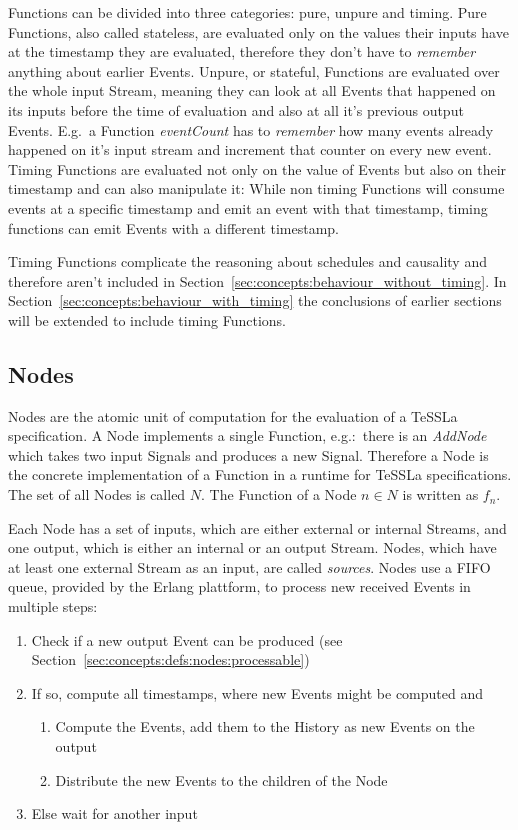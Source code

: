 Functions can be divided into three categories: pure, unpure and timing.
Pure Functions, also called stateless, are evaluated only on the values their inputs have at the timestamp they are evaluated, therefore they don't have to \emph{remember} anything about earlier Events.
Unpure, or stateful, Functions are evaluated over the whole input Stream, meaning they can look at all Events that happened on its inputs before the time of evaluation and also at all it's previous output Events.
E.g.\ a Function \emph{eventCount} has to \emph{remember} how many events already happened on it's input stream and increment that counter on every new event.
Timing Functions are evaluated not only on the value of Events but also on their timestamp and can also manipulate it:
While non timing Functions will consume events at a specific timestamp and emit an event with that timestamp, timing functions can emit Events with a different timestamp.

Timing Functions complicate the reasoning about schedules and causality and therefore aren't included in Section~\ref{sec:concepts:behaviour_without_timing}.
In Section~\ref{sec:concepts:behaviour_with_timing} the conclusions of earlier sections will be extended to include timing Functions.


\subsection{Nodes}
\label{sec:concepts:defs:nodes}

Nodes are the atomic unit of computation for the evaluation of a TeSSLa specification.
A Node implements a single Function, e.g.:\ there is an \emph{AddNode} which takes two input Signals and produces a new Signal.
Therefore a Node is the concrete implementation of a Function in a runtime for TeSSLa specifications.
The set of all Nodes is called \(N\).
The Function of a Node \(n \in N\) is written as \(f_n\).

Each Node has a set of inputs, which are either external or internal Streams, and one output, which is either an internal or an output Stream.
Nodes, which have at least one external Stream as an input, are called \emph{sources}.
Nodes use a FIFO queue, provided by the Erlang plattform, to process new received Events in multiple steps:

\begin{enumerate}
  \item Check if a new output Event can be produced (see Section~\ref{sec:concepts:defs:nodes:processable})
  \item If so, compute all timestamps, where new Events might be computed and
    \begin{enumerate}
      \item Compute the Events, add them to the History as new Events on the output
      \item Distribute the new Events to the children of the Node
    \end{enumerate}
  \item Else wait for another input
\end{enumerate}

